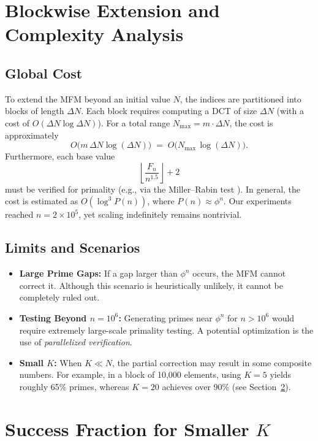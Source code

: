 \documentclass[12pt]{article}
\begin{document}
\section{Blockwise Extension and Complexity Analysis}

\subsection{Global Cost}
To extend the MFM beyond an initial value $N$, the indices are partitioned into blocks of length $\Delta N$. Each block requires computing a DCT of size $\Delta N$ (with a cost of $O(\Delta N\log \Delta N)$). For a total range $N_{\max}=m\cdot\Delta N$, the cost is approximately
\[
   O\bigl(m\,\Delta N\log(\Delta N)\bigr) \;=\; O\bigl(N_{\max}\,\log(\Delta N)\bigr).
\]
Furthermore, each base value 
\[
\left\lfloor \frac{F_n}{n^{1.5}} \right\rfloor +2
\]
must be verified for primality (e.g., via the Miller–Rabin test \cite{Cormen,Pomerance}). In general, the cost is estimated as $O(\log^3 P(n))$, where $P(n)\approx \phi^n$. Our experiments reached $n=2\times10^5$, yet scaling indefinitely remains nontrivial.

\subsection{Limits and Scenarios}
\begin{itemize}
    \item \textbf{Large Prime Gaps:} If a gap larger than $\phi^n$ occurs, the MFM cannot correct it. Although this scenario is heuristically unlikely, it cannot be completely ruled out.
    \item \textbf{Testing Beyond $n=10^6$:} Generating primes near $\phi^n$ for $n>10^6$ would require extremely large-scale primality testing. A potential optimization is the use of \emph{parallelized verification}.
    \item \textbf{Small $K$:} When $K\ll N$, the partial correction may result in some composite numbers. For example, in a block of 10,000 elements, using $K=5$ yields roughly 65\% primes, whereas $K=20$ achieves over 90\% (see Section~\ref{sec:density}).
\end{itemize}

\section{Success Fraction for Smaller $K$}\label{sec:density}
\end{document}
